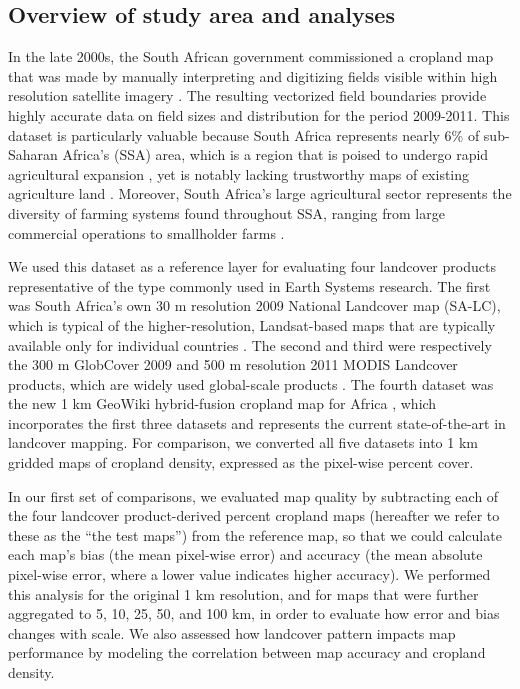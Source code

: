 \documentclass{pnastwo}
\begin{document}
\begin{article}
\section{Overview of study area and analyses}
In the late 2000s, the South African government commissioned a cropland map that was made by manually interpreting and digitizing fields visible within high resolution satellite imagery \cite{fourie_better_2009}. The resulting vectorized field boundaries provide highly accurate data on field sizes and distribution for the period 2009-2011. This dataset is particularly valuable because South Africa represents nearly 6\% of sub-Saharan Africa's (SSA) area, which is a region that is poised to undergo rapid agricultural expansion \cite{searchinger_high_2015}, yet is notably lacking trustworthy maps of existing agriculture land \cite{fritz_comparison_2010}. Moreover, South Africa's large agricultural sector represents the diversity of farming systems found throughout SSA, ranging from large commercial operations to smallholder farms \cite{hardy_rainfed_2011,estes_using_2014}.

We used this dataset as a reference layer for evaluating four landcover products representative of the type commonly used in Earth Systems research. The first was South Africa's own 30 m resolution 2009 National Landcover map (SA-LC)\cite{sanbi_national_2009}, which is typical of the higher-resolution, Landsat-based maps that are typically available only for individual countries \cite[e.g.][]{fry_completion_2009}. The second and third were respectively the 300 m GlobCover 2009 \cite{arino_global_2012} and 500 m resolution 2011 MODIS Landcover products, which are widely used global-scale products \cite[e.g.][]{gross_monitoring_2013, shackelford_conservation_2015}. The fourth dataset was the new 1 km GeoWiki hybrid-fusion cropland map for Africa \cite{fritz_mapping_2015}, which incorporates the first three datasets and represents the current state-of-the-art in landcover mapping.  For comparison, we converted all five datasets into 1 km gridded maps of cropland density, expressed as the pixel-wise percent cover.  

In our first set of comparisons, we evaluated map quality by subtracting each of the four landcover product-derived percent cropland maps (hereafter we refer to these as the ``the test maps'') from the reference map, so that we could calculate each map's bias (the mean pixel-wise error) and accuracy (the mean absolute pixel-wise error, where a lower value indicates higher accuracy). We performed this analysis for the original 1 km resolution, and for maps that were further aggregated to 5, 10, 25, 50, and 100 km, in order to evaluate how error and bias changes with scale. We also assessed how landcover pattern impacts map performance by modeling the correlation between map accuracy and cropland density.  


\end{article}
\end{document}
